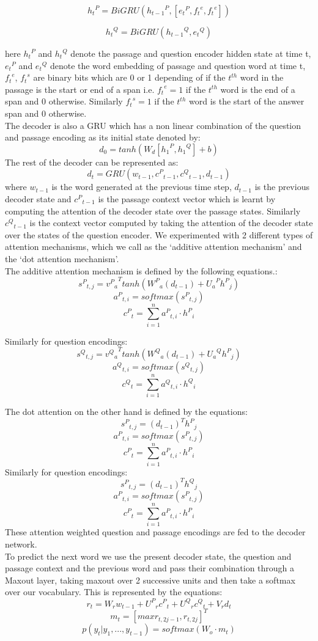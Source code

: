 \[ {h_t}^P = BiGRU({h_{t-1}}^P, [{e_t}^P, {f_t}^e, {f_t}^e]) \]

\[{h_t}^Q = BiGRU({h_{t-1}}^Q, {e_t}^Q) \]

here ${h_t}^P$ and ${h_t}^Q$ denote the passage and question encoder hidden state at time t, ${e_t}^P$ and ${e_t}^Q$ denote the word embedding of  passage and question word at time t, ${f_t}^e$, ${f_t}^s$ are binary bits which are 0 or 1 depending of if the $t^{th}$ word in the passage is the start or end of a span i.e.  ${f_t}^e = 1$ if the $t^{th}$ word is the end of a span and 0 otherwise. Similarly ${f_t}^s = 1$ if the $t^{th}$ word is the start of the answer span and 0 otherwise.\\
The decoder is also a GRU which has a non linear combination of the question and passage encoding as its initial state denoted by:
\[ d_0 = tanh(W_d[{h_1}^P, {h_1}^Q] + b) \]
The rest of the decoder can be represented as:
\[d_t = GRU(w_{t-1}, {c^P}_{t-1}, {c^Q}_{t-1}, d_{t-1})\]
where $w_{t−1}$ is the word generated at the previous time step, $d_{t−1}$ is the previous decoder state and ${c^P}_{t-1}$ is the passage context vector which is learnt by computing the attention of the decoder state over the passage states. Similarly ${c^Q}_{t-1}$ is the context vector computed by taking the attention of the decoder state over the states of the question encoder. 
We experimented with 2 different types of attention mechanisms, which we call as the `additive attention mechanism' and the `dot attention mechanism'. \\
The additive attention mechanism is defined by the following equations.:\\
\[  {{s^P}_{t,j}} = {{v^P}_a}^Ttanh({W^P}_a(d_{t-1}) + {U_a}^P{h^P}_j )\]
\[{a^P}_{t,i} = softmax({{s^P}_{t,j}})\]
\[{c^P}_t = \sum_{i=1}^n {a^P}_{t,i} \cdot {h^P}_i\]

Similarly for question encodings:\\
\[  {{s^Q}_{t,j}} = {{v^Q}_a}^Ttanh({W^Q}_a(d_{t-1}) + {U_a}^Q{h^P}_j )\]
\[{a^Q}_{t,i} = softmax({{s^Q}_{t,j}})\]
\[{c^Q}_t = \sum_{i=1}^n {a^Q}_{t,i} \cdot {h^Q}_i\]

The dot attention on the other hand is defined by the equations:\\
\[  {{s^P}_{t,j}} = (d_{t-1})^T{h^P}_j \]
\[{a^P}_{t,i} = softmax({{s^P}_{t,j}})\]
\[{c^P}_t = \sum_{i=1}^n {a^P}_{t,i} \cdot {h^P}_i\]
Similarly for question encodings:\\
\[  {{s^P}_{t,j}} = (d_{t-1})^T{h^Q}_j \]
\[{a^P}_{t,i} = softmax({{s^P}_{t,j}})\]
\[{c^P}_t = \sum_{i=1}^n {a^P}_{t,i} \cdot {h^P}_i\]
These attention weighted question and passage encodings are fed to the decoder network.\\
To predict the next word we use the present decoder state, the question and passage context and the previous word and pass their combination through a Maxout layer, taking maxout over 2 successive units and then take a softmax over our vocabulary. This is represented by the equations:\\
\[r_t = W_rw_{t-1} + {U^P}_r{c^P}_t + {U^Q}_r{c^Q}_t + V_rd_t \]
\[m_t = [max{r_{t,2j-1}, r_{t,2j}}]^T \]
\[p(y_t|y_1, . . . , y_{t-1}) = softmax(W_o \cdot m_t) \]




